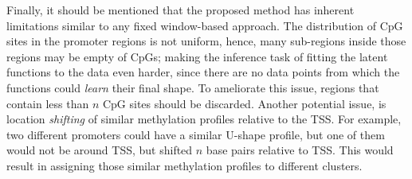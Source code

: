 Finally, it should be mentioned that the proposed method has inherent limitations similar to any fixed window-based approach. The distribution of CpG sites in the promoter regions is not uniform, hence, many sub-regions inside those regions may be empty of CpGs; making the inference task of fitting the latent functions to the data even harder, since there are no data points from which the functions could \emph{learn} their final shape. To ameliorate this issue, regions that contain less than $n$ CpG sites should be discarded. Another potential issue, is location \emph{shifting} of similar methylation profiles relative to the TSS. For example, two different promoters could have a similar U-shape profile, but one of them would not be around TSS, but shifted $n$ base pairs relative to TSS. This would result in assigning those similar methylation profiles to different clusters. 